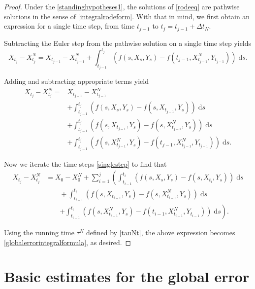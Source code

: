 \documentclass[reqno,12pt]{amsart}
\theoremstyle{plain} %
\theoremstyle{definition} %
\begin{document}
\begin{proof}
    Under the \cref{standinghypotheses1}, the solutions of \cref{rodeeq} are pathwise solutions in the sense of \cref{integralrodeform}. With that in mind, we first obtain an expression for a single time step, from time $t_{j-1}$ to $t_j = t_{j-1} + \Delta t_N$.
    
    Subtracting the Euler step from the pathwise solution on a single time step yields
    $$
    X_{t_j} - X_{t_j}^N = X_{t_{j-1}} - X_{t_{j-1}}^N + \int_{t_{j-1}}^{t_j} \left( f(s, X_s, Y_s) - f(t_{j-1}, X_{t_{j-1}}^N, Y_{t_{j-1}}) \right)\;\mathrm{d}s.
    $$

    Adding and subtracting appropriate terms yield
    \begin{equation}
        \label{singlestep}
        \begin{aligned}
            X_{t_j} - X_{t_j}^N  = & X_{t_{j-1}} - X_{t_{j-1}}^N \\
            & + \int_{t_{j-1}}^{t_j} \left( f(s, X_s, Y_s) - f(s, X_{t_{j-1}}, Y_s) \right)\;\mathrm{d}s \\ 
            & + \int_{t_{j-1}}^{t_j} \left( f(s, X_{t_{j-1}}, Y_s) - f(s, X_{t_{j-1}}^N, Y_s) \right)\;\mathrm{d}s \\
            & + \int_{t_{j-1}}^{t_j} \left( f(s, X_{t_{j-1}}^N, Y_s) - f(t_{j-1}, X_{t_{j-1}}^N, Y_{t_{j-1}}) \right)\;\mathrm{d}s.
        \end{aligned}
    \end{equation}

    Now we iterate the time steps \cref{singlestep} to find that
    \begin{align*}
        X_{t_j} - X_{t_j}^N & = X_0 - X_0^N + \sum_{i=1}^{j} \left(\int_{t_{i-1}}^{t_i} \left( f(s, X_s, Y_s) - f(s, X_{t_{i}}, Y_s) \right)\;\mathrm{d}s \right. \\ 
        & \qquad + \int_{t_{i-1}}^{t_i} \left( f(s, X_{t_{i-1}}, Y_s) - f(s, X_{t_{i-1}}^N, Y_s) \right)\;\mathrm{d}s \\
        & \qquad \left. + \int_{t_{i-1}}^{t_i} \left( f(s, X_{t_{i-1}}^N, Y_s) - f(t_{i-1}, X_{t_{i-1}}^N, Y_{t_{i-1}}) \right)\;\mathrm{d}s \right).
    \end{align*}

    Using the running time $\tau^N$ defined by \cref{tauNt}, the above expression becomes \cref{globalerrorintegralformula}, as desired.
\end{proof}

\section{Basic estimates for the global error}
\end{document}
